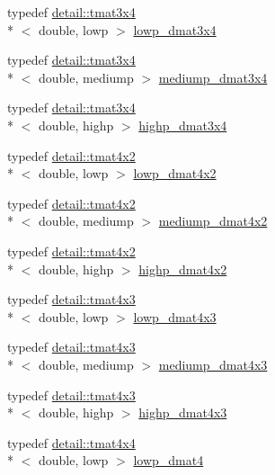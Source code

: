 \begin{DoxyCompactItemize}
typedef \hyperlink{structglm_1_1detail_1_1tmat3x4}{detail\-::tmat3x4}\\*
$<$ double, lowp $>$ \hyperlink{group__core__precision_ga4640e1d20ad705842525e79a4cc57b15}{lowp\-\_\-dmat3x4}
\item 
typedef \hyperlink{structglm_1_1detail_1_1tmat3x4}{detail\-::tmat3x4}\\*
$<$ double, mediump $>$ \hyperlink{group__core__precision_gaedd814e706701200b13b86fc6fd7b373}{mediump\-\_\-dmat3x4}
\item 
typedef \hyperlink{structglm_1_1detail_1_1tmat3x4}{detail\-::tmat3x4}\\*
$<$ double, highp $>$ \hyperlink{group__core__precision_gaff199c8d04a8edb92ed43283e8694c59}{highp\-\_\-dmat3x4}
\item 
typedef \hyperlink{structglm_1_1detail_1_1tmat4x2}{detail\-::tmat4x2}\\*
$<$ double, lowp $>$ \hyperlink{group__core__precision_ga28a7ef670069c3707f19b9de1039517e}{lowp\-\_\-dmat4x2}
\item 
typedef \hyperlink{structglm_1_1detail_1_1tmat4x2}{detail\-::tmat4x2}\\*
$<$ double, mediump $>$ \hyperlink{group__core__precision_ga03056b616496470371473cd5df4dc1f8}{mediump\-\_\-dmat4x2}
\item 
typedef \hyperlink{structglm_1_1detail_1_1tmat4x2}{detail\-::tmat4x2}\\*
$<$ double, highp $>$ \hyperlink{group__core__precision_gaa4fb1ed350a6cd053abb9b093d13ce0d}{highp\-\_\-dmat4x2}
\item 
typedef \hyperlink{structglm_1_1detail_1_1tmat4x3}{detail\-::tmat4x3}\\*
$<$ double, lowp $>$ \hyperlink{group__core__precision_gabc1be51eb0cae7cd4b1d6483a954c35d}{lowp\-\_\-dmat4x3}
\item 
typedef \hyperlink{structglm_1_1detail_1_1tmat4x3}{detail\-::tmat4x3}\\*
$<$ double, mediump $>$ \hyperlink{group__core__precision_gafa1ba33d2748737129cde471fedbf9c5}{mediump\-\_\-dmat4x3}
\item 
typedef \hyperlink{structglm_1_1detail_1_1tmat4x3}{detail\-::tmat4x3}\\*
$<$ double, highp $>$ \hyperlink{group__core__precision_gaf8aeba0eecc5c651e0f06414b6e37754}{highp\-\_\-dmat4x3}
\item 
typedef \hyperlink{structglm_1_1detail_1_1tmat4x4}{detail\-::tmat4x4}\\*
$<$ double, lowp $>$ \hyperlink{group__core__precision_gaea69794db4e619881b77d37bf84b337e}{lowp\-\_\-dmat4}

\end{DoxyCompactItemize}
